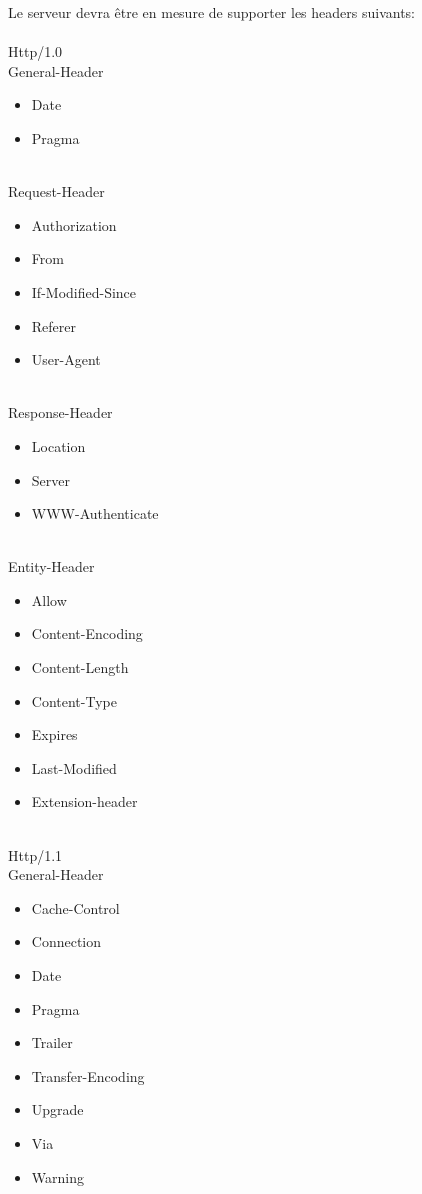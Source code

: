 \documentclass{scrreprt}
\begin{document}
Le serveur devra être en mesure de supporter les headers suivants: \\
\\
Http/1.0\\
    General-Header\\
        \begin{itemize}
        \item Date
        \item Pragma
        \end{itemize}
\\
    Request-Header\\
        \begin{itemize}
        \item Authorization
        \item From      
        \item If-Modified-Since
        \item Referer          
        \item User-Agent       
        \end{itemize}
\\
    Response-Header\\
        \begin{itemize}
        \item Location           
        \item Server          
        \item WWW-Authenticate
        \end{itemize}
\\
    Entity-Header\\
        \begin{itemize}
        \item Allow               
        \item Content-Encoding 
        \item Content-Length    
        \item Content-Type      
        \item Expires           
        \item Last-Modified     
        \item Extension-header
        \end{itemize}
\\
Http/1.1\\
    General-Header\\
        \begin{itemize}
        \item Cache-Control      
        \item Connection      
        \item Date            
        \item Pragma          
        \item Trailer         
        \item Transfer-Encoding
        \item Upgrade          
        \item Via              
        \item Warning          
        \end{itemize}
\end{document}
